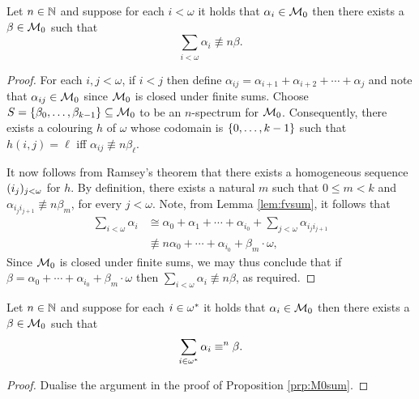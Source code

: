 \begin{prp}\label{prp:M0sum}
	Let $n\in\mathbb{N}$ and suppose for each $i<\omega$ it holds that $\alpha_i\in\mathcal{M}_0$ then there exists a $\beta\in\mathcal{M}_0$ such that
	\begin{equation}
		\sum_{i<\omega}\alpha_i\nequiv{n}\beta.
	\end{equation}
\end{prp}
\begin{proof}
	For each $i,j<\omega$, if $i<j$ then define $\alpha_{ij}=\alpha_{i+1}+\alpha_{i+2}+\dotsb+\alpha_j$ and note that $\alpha_{ij}\in\mathcal{M}_0$ since $\mathcal{M}_0$ is closed under finite sums.  Choose $S=\left\lbrace \beta_0,\dotsc,\beta_{k-1}\right\rbrace\subseteq\mathcal{M}_0$ to be an $n$-spectrum for $\mathcal{M}_0$.  Consequently, there exists a colouring $h$ of $\omega$ whose codomain is $\left\lbrace 0,\dotsc,k-1\right\rbrace$ such that $h(i,j)=\ell$ iff $\alpha_{ij}\nequiv{n}\beta_\ell$.

	It now follows from Ramsey's theorem that there exists a homogeneous sequence $(i_j)_{j<\omega}$ for $h$.  By definition, there exists a natural $m$ such that $0\leq m<k$ and $\alpha_{i_ji_{j+1}}\nequiv{n}\beta_m$, for every $j<\omega$.  Note, from Lemma \ref{lem:fvsum}, it follows that
	\begin{align}
		\sum_{i<\omega}\alpha_i&\cong\alpha_0+\alpha_1+\dotsb+\alpha_{i_0}+\sum_{j<\omega}\alpha_{i_ji_{j+1}}\\
		&\nequiv{n}\alpha_0+\dotsb+\alpha_{i_0}+\beta_m\cdot\omega,
	\end{align}
	Since $\mathcal{M}_0$ is closed under finite sums, we may thus conclude that if $\beta=\alpha_0+\dotsb+\alpha_{i_0}+\beta_m\cdot\omega$ then $\sum_{i<\omega}\alpha_i\nequiv{n}\beta$, as required.
\end{proof}

\begin{prp}\label{prp:M0sumop}
	Let $n\in\mathbb{N}$ and suppose for each $i\in{\omega}^\ast$ it holds that $\alpha_i\in\mathcal{M}_0$ then there exists a $\beta\in\mathcal{M}_0$ such that
	\begin{equation}
		\sum_{i\in{\omega}^\ast}\alpha_i\equiv^{n}\beta.
	\end{equation}
\end{prp}
\begin{proof}
	Dualise the argument in the proof of Proposition \ref{prp:M0sum}.
\end{proof}


